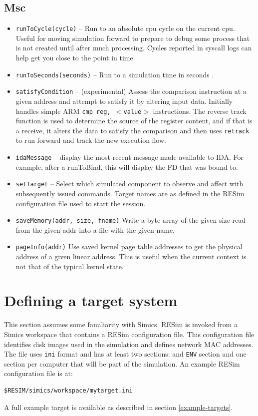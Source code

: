 \documentclass[titlepage]{article}
\begin{document}
\subsection{Msc}
\begin{itemize}
\item{\tt runToCycle(cycle)} -- Run to an absolute cpu cycle on the current cpu.  Useful for moving simulation forward to prepare to debug some process
that is not created until after much processing.  Cycles reported in syscall logs can help get you close to the point in time.

\item{\tt runToSeconds(seconds)} -- Run to a simulation time in seconds .  

\item{\tt satisfyCondition} -- (experimental) Assess the comparison instruction at a given address and attempt to satisfy it by altering input data.  
Initially handles simple ARM {\tt cmp reg, $<$value$>$} instructions.  The 
reverse track function is used to determine the source of the register content, and if that is a receive, it alters the data to satisfy the
comparison and then uses {\tt retrack} to run forward and track the new execution flow.

\item{\tt idaMessage} -- display the most recent message made available to IDA.  For example, after a runToBind, this will display the FD that was bound to.
\item {\tt setTarget} -- Select which simulated component to observe and affect with subsequently issued commands.  Target names are as defined in the
RESim configuration file used to start the session.

\item {\tt saveMemory(addr, size, fname)} Write a byte array of the given size read from the given addr into a file with the given name.

\item {\tt pageInfo(addr)} Use saved kernel page table addresses to get the physical address of a given linear address.  This is useful when the current
context is not that of the typical kernel state.



\end{itemize}

\section{Defining a target system}
\label{configuration}
This section assumes some familiarity with Simics.  RESim is invoked from a Simics workspace that contains a RESim configuration file.
This configuration file identifies disk images used in the simulation and defines network MAC addresses.  
The file uses {\tt ini} format and has at least two sections: and {\tt ENV} section and one section per computer that will be part
of the simulation.  An example RESim configuration file is at:
\begin{verbatim}
$RESIM/simics/workspace/mytarget.ini
\end{verbatim}
A full example target is available as described in section \ref{example-targets}.
\end{document}
